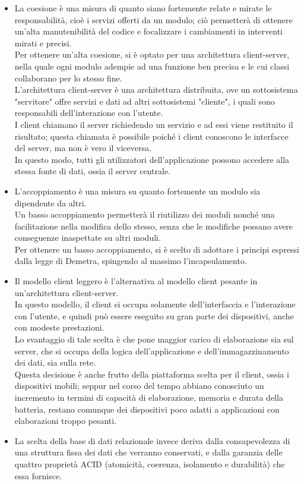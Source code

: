         \begin{itemize}
            \item La coesione è una misura di quanto siano fortemente relate e mirate le responsabilità, cioè i servizi offerti da un modulo; ciò permetterà di ottenere un’alta manutenibilità del codice e focalizzare i cambiamenti in interventi mirati e precisi. \\
            Per ottenere un'alta coesione, si è optato per una architettura client-server, nella quale ogni modulo adempie ad una funzione ben precisa e le cui classi collaborano per lo stesso fine. \\
            L'architettura client-server è una architettura distribuita, ove un sottosistema "servitore" offre servizi e dati ad altri sottosistemi "cliente", i quali sono responsabili dell'interazione con l'utente. \\
            I client chiamano il server richiedendo un servizio e ad essi viene restituito il risultato; questa chiamata è possibile poiché i client conoscono le interfacce del server, ma non è vero il viceversa. \\
            In questo modo, tutti gli utilizzatori dell'applicazione possono accedere alla stessa fonte di dati, ossia il server centrale.
            \item L’accoppiamento è una misura su quanto fortemente un modulo sia dipendente da altri. \\
            Un basso accoppiamento permetterà il riutilizzo dei moduli nonché una facilitazione nella modifica dello stesso, senza che le modifiche possano avere conseguenze inaspettate su altri moduli. \\
            Per ottenere un basso accoppiamento, si è scelto di adottare i principi espressi dalla legge di Demetra, spingendo al massimo l'incapsulamento.
            \item Il modello client leggero è l'alternativa al modello client pesante in un'architettura client-server. \\
            In questo modello, il client si occupa solamente dell'interfaccia e l'interazione con l'utente, e quindi può essere eseguito su gran parte dei dispositivi, anche con modeste prestazioni. \\
            Lo svantaggio di tale scelta è che pone maggior carico di elaborazione sia sul server, che si occupa della logica dell'applicazione e dell'immagazzinamento dei dati, sia sulla rete. \\
            Questa decisione è anche frutto della piattaforma scelta per il client, ossia i dispositivi mobili; seppur nel corso del tempo abbiano conosciuto un incremento in termini di capacità di elaborazione, memoria e durata della batteria, restano comunque dei dispositivi poco adatti a applicazioni con elaborazioni troppo pesanti.
            \item La scelta della base di dati relazionale invece deriva dalla consapevolezza di una struttura fissa dei dati che verranno conservati, e dalla garanzia delle quattro proprietà ACID (atomicità, coerenza, isolamento e durabilità) che essa fornisce.
        \end{itemize}

